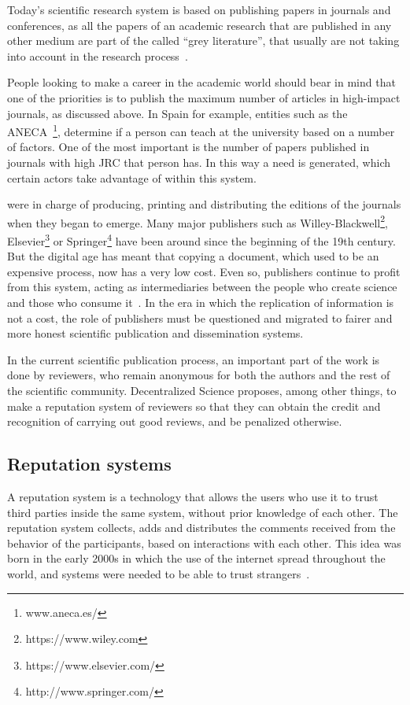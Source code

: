 Today's scientific research system is based on publishing papers in journals and
conferences, as all the papers of an academic research that are published in any
other medium are part of the called ``grey literature'', that usually are not
taking into account in the research process~\cite{rothstein2009grey}.

People looking to make a career in the academic world should bear in mind that
one of the priorities is to publish the maximum number of articles in
high-impact journals, as discussed above. In Spain for example, entities such as
the ANECA~\footnote{www.aneca.es/}, determine if a person can teach at the
university based on a number of factors. One of the most important is the number
of papers published in journals with high JRC that person has. In this way a
need is generated, which certain actors take advantage of within this system.

 were in charge of producing, printing and distributing the
editions of the journals when they began to emerge. Many major publishers such
as Willey-Blackwell\footnote{https://www.wiley.com},
Elsevier\footnote{https://www.elsevier.com/} or
Springer\footnote{http://www.springer.com/} have been around since the beginning
of the 19th century. But the digital age has meant that copying a document,
which used to be an expensive process, now has a very low cost. Even so,
publishers continue to profit from this system, acting as intermediaries between
the people who create science and those who consume
it~\cite{lariviere2015oligopoly}. In the era in which the replication of
information is not a cost, the role of publishers must be questioned and
migrated to fairer and more honest scientific publication and dissemination
systems.

In the current scientific publication process, an important part of the work is
done by reviewers, who remain anonymous for both the authors and the rest of the
scientific community. Decentralized Science proposes, among other things, to
make a reputation system of reviewers so that they can obtain the credit and
recognition of carrying out good reviews, and be penalized otherwise.

\subsection{Reputation systems}
\label{scb:rs}

A reputation system is a technology that allows the users who use it to trust
third parties inside the same system, without prior knowledge of each other. The
reputation system collects, adds and distributes the comments received from the
behavior of the participants, based on interactions with each other. This idea
was born in the early 2000s in which the use of the internet spread throughout
the world, and systems were needed to be able to trust
strangers~\cite{resnick2000reputation}.

